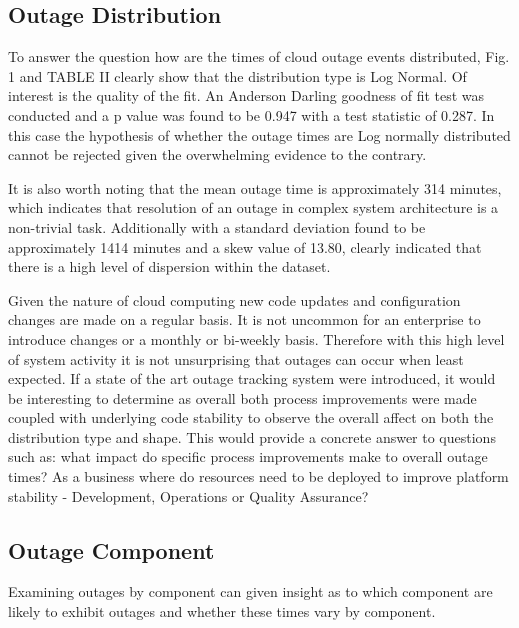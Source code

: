 \documentclass[conference]{IEEEtran}
\begin{document}
\subsection{Outage Distribution}

To answer the question how are the times of cloud outage events distributed, Fig. 1 and TABLE II clearly show that the distribution type is Log Normal. Of interest is the quality of the fit. An Anderson Darling goodness of fit test was conducted and a p value was found to be 0.947 with a test statistic of 0.287. In this case the hypothesis of whether the outage times are Log normally distributed cannot be rejected given the overwhelming evidence to the contrary.  \par

It is also worth noting that the mean outage time is approximately 314 minutes, which indicates that resolution of an outage in complex system architecture is a non-trivial task. Additionally with a standard deviation found to be approximately 1414 minutes and a skew value of 13.80, clearly indicated that there is a high level of dispersion within the dataset. \par

Given the nature of cloud computing new code updates and configuration changes are made on a regular basis. It is not uncommon for an enterprise to introduce changes or a monthly or bi-weekly basis. Therefore with this high level of system activity it is not unsurprising that outages can occur when least expected. If a state of the art outage tracking system were introduced, it would be interesting to determine as overall both process improvements were made coupled with underlying code stability to observe the overall affect on both the distribution type and shape. This would provide a concrete answer to questions such as: what impact do specific process improvements make to overall outage times? As a business where do resources need to be deployed to improve platform stability - Development, Operations or Quality Assurance? \par

\subsection{Outage Component}

Examining outages by component can given insight as to which component are likely to exhibit outages and whether these times vary by component. \par
\end{document}
